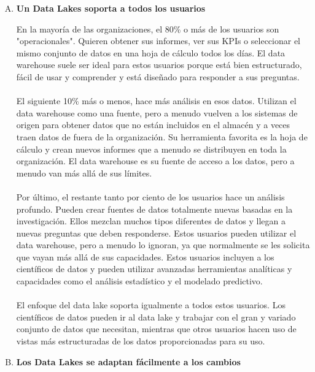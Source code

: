 \documentclass[11pt,a4paper]{article}
\begin{document}
\begin{enumerate}[A.]
				\item \textbf{Un Data Lakes soporta a todos los usuarios}
				
				En la mayoría de las organizaciones, el 80\% o más de los usuarios son "operacionales". Quieren obtener sus informes, ver sus KPIs o seleccionar el mismo conjunto de datos en una hoja de cálculo todos los días. El data warehouse suele ser ideal para estos usuarios porque está bien estructurado, fácil de usar y comprender y está diseñado para responder a sus preguntas.\\
				\\
				El siguiente 10\% más o menos, hace más análisis en esos datos. Utilizan el data warehouse como una fuente, pero a menudo vuelven a los sistemas de origen para obtener datos que no están incluidos en el almacén y a veces traen datos de fuera de la organización. Su herramienta favorita es la hoja de cálculo y crean nuevos informes que a menudo se distribuyen en toda la organización. El data warehouse es su fuente de acceso a los datos, pero a menudo van más allá de sus límites.\\
				\\
				Por último, el restante tanto por ciento de los usuarios hace un análisis profundo. Pueden crear fuentes de datos totalmente nuevas basadas en la investigación. Ellos mezclan muchos tipos diferentes de datos y llegan a nuevas preguntas que deben responderse. Estos usuarios pueden utilizar el data warehouse, pero a menudo lo ignoran, ya que normalmente se les solicita que vayan más allá de sus capacidades. Estos usuarios incluyen a los científicos de datos y pueden utilizar avanzadas herramientas analíticas y capacidades como el análisis estadístico y el modelado predictivo.\\
				\\
				El enfoque del data lake soporta igualmente a todos estos usuarios. Los científicos de datos pueden ir al data lake y trabajar con el gran y variado conjunto de datos que necesitan, mientras que otros usuarios hacen uso de vistas más estructuradas de los datos proporcionadas para su uso.
				
				\item \textbf{Los Data Lakes se adaptan fácilmente a los cambios}
				

\end{enumerate}
\end{document}
